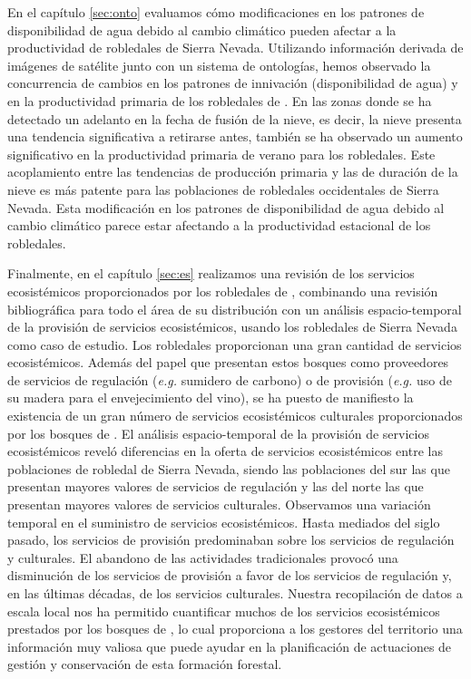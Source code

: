 En el \textcolor{ctcolormain}{capítulo \ref{sec:onto}} evaluamos cómo modificaciones en los patrones de disponibilidad de agua debido al cambio climático pueden afectar a la productividad de robledales de Sierra Nevada. Utilizando información derivada de imágenes de satélite junto con un sistema de ontologías, hemos observado la concurrencia de cambios en los patrones de innivación (disponibilidad de agua) y en la productividad primaria de los robledales de \Qp. En las zonas donde se ha detectado un adelanto en la fecha de fusión de la nieve, es decir, la nieve presenta una tendencia significativa a retirarse antes, también se ha observado un aumento significativo en la productividad primaria de verano para los robledales. Este acoplamiento entre las tendencias de producción primaria y las de duración de la nieve es más patente para las poblaciones de robledales occidentales de Sierra Nevada. Esta modificación en los patrones de disponibilidad de agua debido al cambio climático parece estar afectando a la productividad estacional de los robledales. 

Finalmente, en el \textcolor{ctcolormain}{capítulo \ref{sec:es}} realizamos una revisión de los servicios ecosistémicos proporcionados por los robledales de \Qp, combinando una revisión bibliográfica para todo el área de su distribución con un análisis espacio-temporal de la provisión de servicios ecosistémicos, usando los robledales de Sierra Nevada como caso de estudio. Los robledales proporcionan una gran cantidad de servicios ecosistémicos. Además del papel que presentan estos bosques como proveedores de servicios de regulación (\emph{e.g.} sumidero de carbono) o de provisión (\emph{e.g.} uso de su madera para el envejecimiento del vino), se ha puesto de manifiesto la existencia de un gran número de servicios ecosistémicos culturales proporcionados por los bosques de \Qp. El análisis espacio-temporal de la provisión de servicios ecosistémicos reveló diferencias en la oferta de servicios ecosistémicos entre las poblaciones de robledal de Sierra Nevada, siendo las poblaciones del sur las que presentan mayores valores de servicios de regulación y las del norte las que presentan mayores valores de servicios culturales. Observamos una variación temporal en el suministro de servicios ecosistémicos. Hasta mediados del siglo pasado, los servicios de provisión predominaban sobre los servicios de regulación y culturales. El abandono de las actividades tradicionales provocó una disminución de los servicios de provisión a favor de los servicios de regulación y, en las últimas décadas, de los servicios culturales. Nuestra recopilación de datos a escala local nos ha permitido cuantificar muchos de los servicios ecosistémicos prestados por los bosques de \Qp, lo cual proporciona a los gestores del territorio una información muy valiosa que puede ayudar en la planificación de actuaciones de gestión y conservación de esta formación forestal. 

